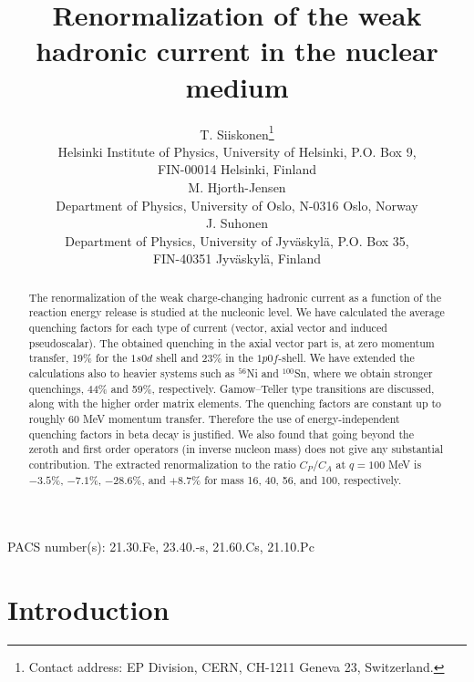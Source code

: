 

\draft


\title{Renormalization of the weak hadronic current in the nuclear
  medium}
\author{T. Siiskonen\footnote{Contact address: EP Division, CERN, 
  CH-1211 Geneva 23, Switzerland.}\\
  Helsinki Institute of Physics, University of Helsinki, P.O. Box 9,\\
  FIN-00014 Helsinki, Finland\\ 
  M. Hjorth-Jensen\\
  Department of Physics, University of Oslo, N-0316 Oslo, Norway\\
  J. Suhonen\\
  Department of Physics, University of Jyv\"{a}skyl\"{a},
  P.O. Box 35,\\ FIN-40351 Jyv\"{a}skyl\"{a}, Finland}
\maketitle

\begin{abstract} 
The renormalization of the weak charge-changing hadronic
current as a function of the reaction energy release is studied at 
the nucleonic level.
We have calculated the average quenching factors for each type of current
(vector, axial vector and induced pseudoscalar). The obtained quenching
in the axial vector part is, at zero momentum transfer, 19\% for the $1s0d$ 
shell and 23\% in the $1p0f$-shell.
We have extended the calculations also to heavier systems such as 
$^{56}$Ni and  $^{100}$Sn,
where we obtain stronger quenchings, 44\% and 59\%, respectively.
Gamow--Teller type transitions are discussed, along with
the higher order matrix elements. The quenching factors are constant up to
roughly 60 MeV momentum transfer. Therefore the use of energy-independent
quenching factors in beta decay is justified. We also found that going 
beyond the zeroth and first order operators (in inverse nucleon mass) does 
not give any substantial contribution. The extracted renormalization to
the ratio $C_P/C_A$ at $q=100$ MeV is $-3.5$\%, $-7.1$\%, $-28.6$\%,
and $+8.7$\% for mass 16, 40, 56, and 100, respectively.
\end{abstract}

PACS number(s): 21.30.Fe, 23.40.-s, 21.60.Cs, 21.10.Pc

\section{Introduction}

